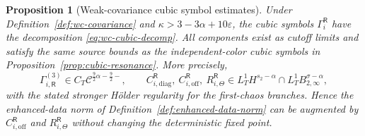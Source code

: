 \documentclass[10pt]{amsart}
\numberwithin{equation}{section}
\theoremstyle{plain}
\newtheorem{proposition}[theorem]{Proposition}
\theoremstyle{definition}
\theoremstyle{remark}
\newcommand{\eps}{\varepsilon}
\begin{document}
\begin{proposition}[Weak-covariance cubic symbol estimates]\label{prop:wc-cubic-symbols}
Under Definition~\ref{def:wc-covariance} and \(\kappa>3-3\alpha+10\eps\), the cubic symbols \(\Gamma_i^{\mathsf R}\) have the decomposition \eqref{eq:wc-cubic-decomp}.  All components exist as cutoff limits and satisfy the same source bounds as the independent-color cubic symbols in Proposition~\ref{prop:cubic-resonance}.  More precisely,
\[
        \Gamma_{i,\mathsf R}^{(3)}\in C_T\mathcal C^{\frac92\alpha-\frac92-},
        \qquad
        C_{i,\mathrm{diag}}^{\mathsf R},\ C_{i,\mathrm{off}}^{\mathsf R},\ R_{i,\Theta}^{\mathsf R}
        \in L_T^1H^{s_2-\alpha}\cap L_T^1B_{2,\infty}^{\sigma-\alpha},
\]
with the stated stronger H\"older regularity for the first-chaos branches.  Hence the enhanced-data norm of Definition~\ref{def:enhanced-data-norm} can be augmented by \(C_{i,\mathrm{off}}^{\mathsf R}\) and \(R_{i,\Theta}^{\mathsf R}\) without changing the deterministic fixed point.
\end{proposition}
\end{document}
